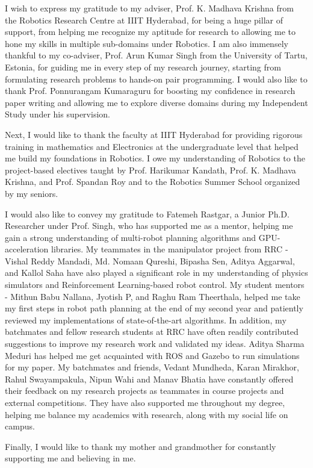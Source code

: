 I wish to express my gratitude to my adviser, Prof. K. Madhava Krishna from the Robotics Research Centre at IIIT Hyderabad, for being a huge pillar of support, from helping me recognize my aptitude for research to allowing me to hone my skills in multiple sub-domains under Robotics. I am also immensely thankful to my co-adviser, Prof. Arun Kumar Singh from the University of Tartu, Estonia, for guiding me in every step of my research journey, starting from formulating research problems to hands-on pair programming. I would also like to thank Prof. Ponnurangam Kumaraguru for boosting my confidence in research paper writing and allowing me to explore diverse domains during my Independent Study under his supervision.

Next, I would like to thank the faculty at IIIT Hyderabad for providing rigorous training in mathematics and Electronics at the undergraduate level that helped me build my foundations in Robotics. I owe my understanding of Robotics to the project-based electives taught by Prof. Harikumar Kandath, Prof. K. Madhava Krishna, and Prof. Spandan Roy and to the Robotics Summer School organized by my seniors. 


I would also like to convey my gratitude to Fatemeh Rastgar, a Junior Ph.D. Researcher under Prof. Singh, who has supported me as a mentor, helping me gain a strong understanding of multi-robot planning algorithms and GPU-acceleration libraries. My teammates in the manipulator project from RRC - Vishal Reddy Mandadi, Md. Nomaan Qureshi, Bipasha Sen, Aditya Aggarwal, and Kallol Saha have also played a significant role in my understanding of physics simulators and Reinforcement Learning-based robot control. My student mentors - Mithun Babu Nallana, Jyotish P, and Raghu Ram Theerthala, helped me take my first steps in robot path planning at the end of my second year and patiently reviewed my implementations of state-of-the-art algorithms. In addition, my batchmates and fellow research students at RRC have often readily contributed suggestions to improve my research work and validated my ideas. Aditya Sharma Meduri has helped me get acquainted with ROS and Gazebo to run simulations for my paper. My batchmates and friends, Vedant Mundheda, Karan Mirakhor, Rahul Swayampakula, Nipun Wahi and Manav Bhatia have constantly offered their feedback on my research projects as teammates in course projects and external competitions. They have also supported me throughout my degree, helping me balance my academics with research, along with my social life on campus.

Finally, I would like to thank my mother and grandmother for constantly supporting me and believing in me. 
